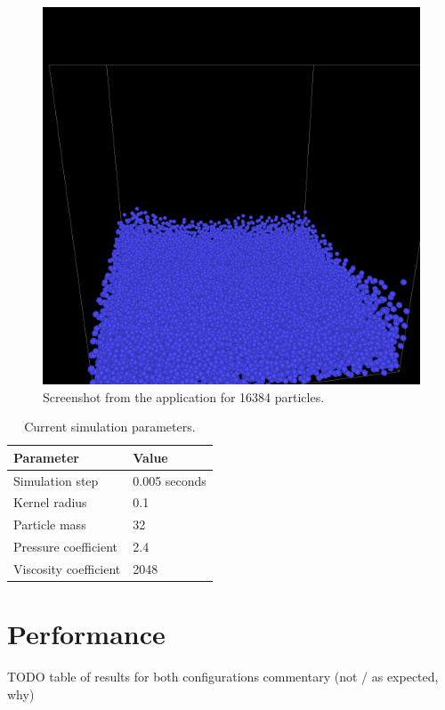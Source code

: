 \documentclass[a4paper,report]{IEEEtran}
\begin{document}
\begin{figure}[!h]
\centering
\includegraphics[width=1\linewidth]{screenshot}
\caption{Screenshot from the application for 16384 particles.}
\label{fig:screen}
\end{figure}

\begin{table}[h]
	\normalsize
	\centering
	\begin{tabular}{|l|l|}
		\hline
		\textbf{Parameter} & \textbf{Value} \\
		\hline
		\hline
		Simulation step 	& 0.005 seconds \\
		Kernel radius 	& 0.1 \\
		Particle mass 	& 32 \\
		Pressure coefficient	& 2.4 \\ 
		Viscosity coefficient 	& 2048 \\
		\hline
	\end{tabular}
	\caption{Current simulation parameters.}
	\label{table:parameters}
\end{table}


\section{Performance}
TODO table of results for both configurations
commentary (not / as expected, why)
\end{document}
